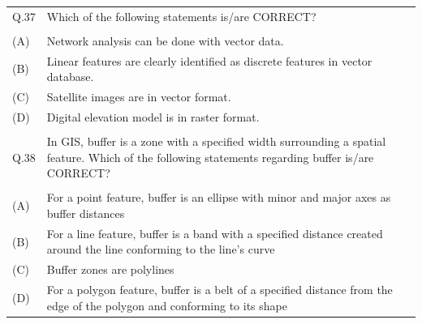\documentclass[12pt]{article}
\begin{document}
\begin{table}[H]
\renewcommand{\arraystretch}{3}
\setlength{\tabcolsep}{8pt}
\begin{tabular}{|l|p{15cm}|}
\hline
 & \\\hline
 
Q.37 &Which of the following statements is/are CORRECT?\\ \hline 
 & \\ \hline
(A)&Network analysis can be done with vector data.\\ \hline
(B)&Linear features are clearly identified as discrete features in vector database.\\ \hline
(C)&Satellite images are in vector format.\\ \hline
(D)&Digital elevation model is in raster format.\\ \hline
 & \\ \hline

Q.38 & In GIS, buffer is a zone with a specified width surrounding a spatial feature. Which
of the following statements regarding buffer is/are CORRECT?\\ \hline
 & \\ \hline
(A)&For a point feature, buffer is an ellipse with minor and major axes as buffer
distances\\ \hline
(B)&For a line feature, buffer is a band with a specified distance created around the line
conforming to the line’s curve\\ \hline
(C)&Buffer zones are polylines\\ \hline
(D)&For a polygon feature, buffer is a belt of a specified distance from the edge of the
polygon and conforming to its shape\\ \hline

 

\end{tabular}
\end{table}
\end{document}
